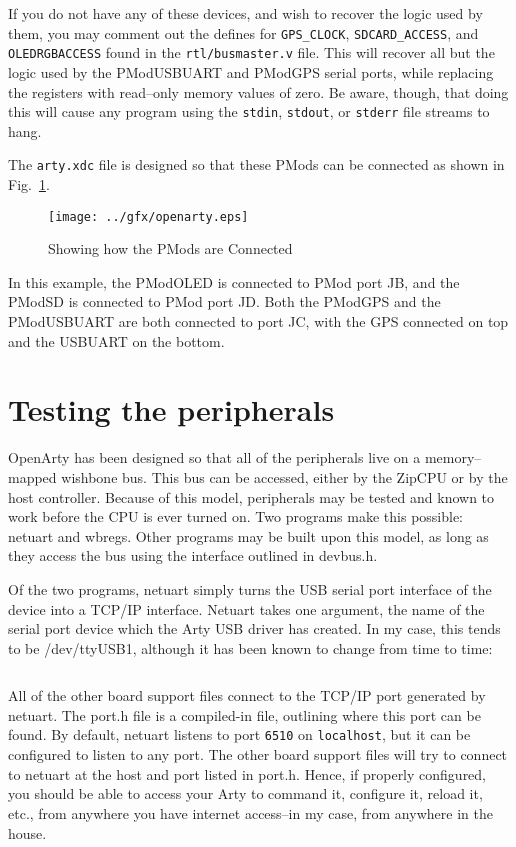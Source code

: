 \documentclass{gqtekspec}
\begin{document}
If you do not have any of these devices, and wish to recover the logic used
by them, you may comment out the defines for {\tt GPS\_CLOCK},
{\tt SDCARD\_ACCESS}, and {\tt OLEDRGBACCESS} found in the {\tt rtl/busmaster.v}
file.  This will recover all but the logic used by the PModUSBUART and PModGPS
serial ports, while replacing the registers with read--only memory values of
zero.  Be aware, though, that doing this will cause any program using
the {\tt stdin}, {\tt stdout}, or {\tt stderr} file streams to hang.

The {\tt arty.xdc} file is designed so that these PMods can be connected as
shown in Fig.~\ref{fig:pmod-pic}.
\begin{figure}\begin{center}
\texttt{[image: ../gfx/openarty.eps]}
\caption{Showing how the PMods are Connected}\label{fig:pmod-pic}
\end{center}\end{figure}
In this example, the PModOLED is connected to PMod port JB, and the PModSD is
connected to PMod port JD.  Both the PModGPS and the PModUSBUART are both
connected to port JC, with the GPS connected on top and the USBUART on the
bottom.

\section{Testing the peripherals}
OpenArty has been designed so that all of the peripherals live on a 
memory--mapped wishbone bus.  This bus can be accessed, either by the ZipCPU
or by the host controller.  Because of this model, peripherals may be tested
and known to work before the CPU is ever turned on.  Two programs make this
possible: netuart and wbregs.  Other programs may be built upon this model,
as long as they access the bus using the interface outlined in devbus.h.

Of the two programs, netuart simply turns the USB serial port interface of
the device into a TCP/IP interface.  Netuart takes one argument, the 
name of the serial port device which the Arty USB driver has created.  In
my case, this tends to be /dev/ttyUSB1, although it has been known to change
from time to time:

\begin{lstlisting}[language=bash]
% netuart /dev/ttyUSB1
\end{lstlisting} 

All of the other board support files connect to the TCP/IP port generated
by netuart.  The port.h file is a compiled-in file, outlining where this
port can be found.  By default, netuart listens to port {\tt 6510} on
{\tt localhost}, but it can be configured to listen to any port.  The other
board support files will try to connect to netuart at the host and port
listed in port.h.  Hence, if properly configured, you should be able to 
access your Arty to command it, configure it, reload it, etc., from anywhere
you have internet access--in my case, from anywhere in the house.
\end{document}
